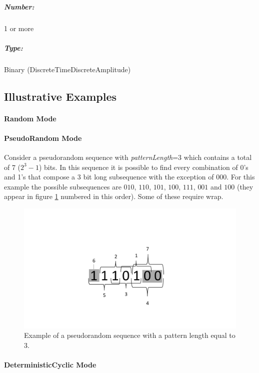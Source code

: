 \subparagraph*{Number:} 1 or more

\subparagraph*{Type:} Binary (DiscreteTimeDiscreteAmplitude)

\subsection*{Illustrative Examples}

\paragraph*{Random Mode}

\paragraph*{PseudoRandom Mode}
Consider a pseudorandom sequence with \textit{patternLength}=3 which contains a total of 7 ($2^3-1$) bits. In this sequence it is possible to find every combination of 0's and 1's that compose a 3 bit long subsequence with the exception of $000$. For this example the possible subsequences are $010$, $110$, $101$, $100$, $111$, $001$ and $100$ (they appear in figure \ref{BinarySequenceN3} numbered in this order). Some of these require wrap.

\begin{figure}[h]
	\centering
\includegraphics[width=\textwidth]{./lib/binary_source/figures/BinarySequenceN3.pdf}
\caption{Example of a pseudorandom sequence with a pattern length equal to 3.}\label{BinarySequenceN3}
\end{figure}

\paragraph*{DeterministicCyclic Mode}

